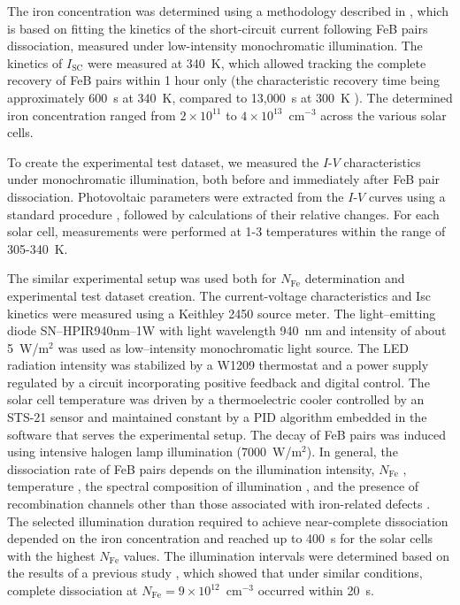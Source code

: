 \documentclass[a4paper,fleqn]{cas-sc}
\begin{document}
The iron concentration was determined using a methodology described in \cite{Olikh2022:JMatSci,Olikh2021JAP},
which is based on fitting the kinetics of the short-circuit current following FeB pairs dissociation,
measured under low-intensity monochromatic illumination.
The kinetics of $I_\mathrm{SC}$ were measured at 340~K, which allowed tracking the complete recovery of FeB pairs within 1 hour only
(the characteristic recovery time being approximately 600~s at 340~K, compared to 13,000~s at 300~K \cite{FeBAssJAP2014,FeBKin2019}).
The determined iron concentration ranged from $2\times10^{11}$ to $4\times10^{13}$~cm$^{-3}$ across the various solar cells.

To create the experimental test dataset, we measured the $I$-$V$ characteristics under monochromatic illumination,
both before and immediately after FeB pair dissociation.
Photovoltaic parameters were extracted from the $I$-$V$ curves using a standard procedure \cite{SCparam2017},
followed by calculations of their relative changes.
For each solar cell, measurements were performed at 1-3 temperatures within the range of 305-340~K.


The similar experimental setup was used both for $N_\mathrm{Fe}$ determination and experimental test dataset creation.
The current-voltage characteristics and Isc kinetics were measured using a Keithley 2450 source meter.
The light--emitting diode SN--HPIR940nm--1W with light wavelength 940~nm and intensity of about 5~W/m$^{2}$ was used as low--intensity monochromatic light source.
The LED radiation intensity was stabilized by a W1209 thermostat and a power supply regulated by a circuit incorporating positive feedback and digital control.
The solar cell temperature was driven by a thermoelectric cooler controlled by an STS-21 sensor
and maintained constant by a PID algorithm embedded in the software that serves the experimental setup.
The decay of FeB pairs was induced using intensive halogen lamp illumination (7000~W/m$^{2}$).
In general, the dissociation rate of FeB pairs depends on the illumination intensity, $N_\mathrm{Fe}$
\cite{FeBAssJAP2014,FeMethod2012, FeBLight2},
temperature \cite{lauer2016},
the spectral composition of illumination \cite{OlikhPSSA},
and the presence of recombination channels other than those associated with iron-related defects \cite{FeBAssJAP2014,FeBLight2}.
The selected illumination duration required to achieve near-complete dissociation depended on the iron concentration
and reached up to 400~s for the solar cells with the highest $N_\mathrm{Fe}$ values.
The illumination intervals were determined based on the results of a previous study \cite{OlikhPSSA},
which showed that under similar conditions, complete dissociation at $N_\mathrm{Fe}=9\times10^{12}$~cm$^{-3}$ occurred within 20~s.
\end{document}
